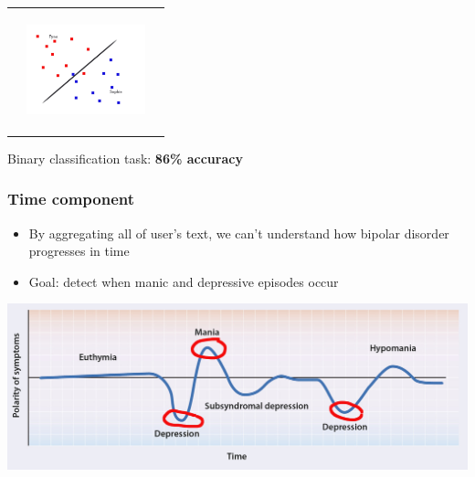 \begin{frame}
\begin{adjustwidth}{-1.5em}{-1.5em}
\begin{tabular}{lll}
           & \includegraphics[width=130, height=130,keepaspectratio]{fig/clf2.jpg}
    \end{tabular}

    \begin{center}
        \large{Binary classification task: \textbf{86\% accuracy}}
    \end{center}
    
    \end{adjustwidth}
\end{frame}

\begin{frame}
  \frametitle{Time component}
  \begin{itemize}
      \item By aggregating all of user's text, we can't understand how bipolar disorder progresses in time
      \pause
      \item Goal: detect when manic and depressive episodes occur
  \end{itemize}

  \includegraphics[width=\textwidth,height=0.5\textheight,keepaspectratio]{fig/bipolar-circled.jpg}
\end{frame}

